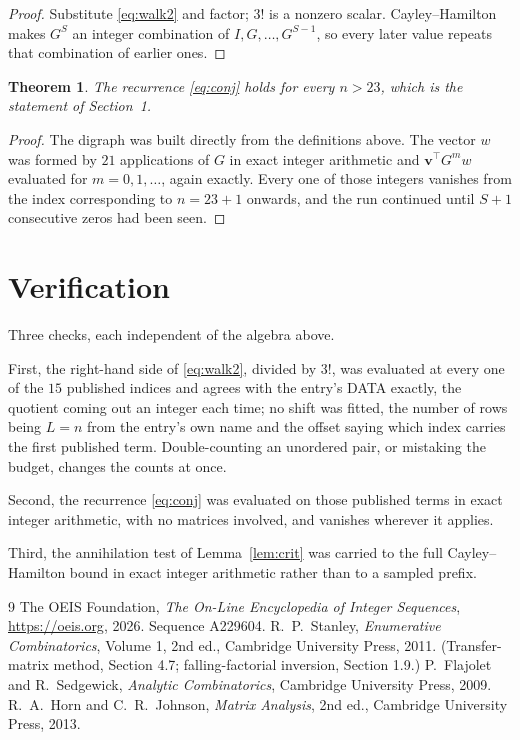 \documentclass[11pt,a4paper]{article}
\theoremstyle{plain}
\newtheorem{theorem}{Theorem}
\theoremstyle{definition}
\begin{document}
\begin{proof}
Substitute \eqref{eq:walk2} and factor; $3!$ is a nonzero scalar. Cayley--Hamilton
makes $G^{S}$ an integer combination of $I,G,\dots,G^{S-1}$, so every later value repeats
that combination of earlier ones.
\end{proof}

\begin{theorem}
The recurrence \eqref{eq:conj} holds for every $n>23$, which is the statement of
Section~1.
\end{theorem}

\begin{proof}
The digraph was built directly from the definitions above. The vector $w$ was formed by
$21$ applications of $G$ in exact integer arithmetic and $\mathbf{v}^{\!\top}G^{m}w$
evaluated for $m=0,1,\dots$, again exactly. Every one of those integers vanishes from the
index corresponding to $n=23+1$ onwards, and the run continued until $S+1$ consecutive
zeros had been seen.
\end{proof}

\section{Verification}

Three checks, each independent of the algebra above.

First, the right-hand side of \eqref{eq:walk2}, divided by $3!$, was evaluated at every
one of the $15$ published indices and agrees with the entry's DATA exactly, the quotient
coming out an integer each time; no shift was fitted, the number of rows being $L=n$
from the entry's own name and the offset saying which index carries the first published term.
Double-counting an unordered pair, or mistaking the budget, changes the counts at once.

Second, the recurrence \eqref{eq:conj} was evaluated on those published terms in exact
integer arithmetic, with no matrices involved, and vanishes wherever it applies.

Third, the annihilation test of Lemma~\ref{lem:crit} was carried to the full
Cayley--Hamilton bound in exact integer arithmetic rather than to a sampled prefix.

\begin{thebibliography}{9}
 The OEIS Foundation, \emph{The On-Line Encyclopedia of Integer
Sequences}, \url{https://oeis.org}, 2026. Sequence A229604.
 R.~P.~Stanley, \emph{Enumerative Combinatorics}, Volume 1, 2nd ed.,
Cambridge University Press, 2011. (Transfer-matrix method, Section 4.7; falling-factorial
inversion, Section 1.9.)
 P.~Flajolet and R.~Sedgewick, \emph{Analytic Combinatorics}, Cambridge
University Press, 2009.
 R.~A.~Horn and C.~R.~Johnson, \emph{Matrix Analysis}, 2nd ed., Cambridge
University Press, 2013.
\end{thebibliography}
\end{document}
